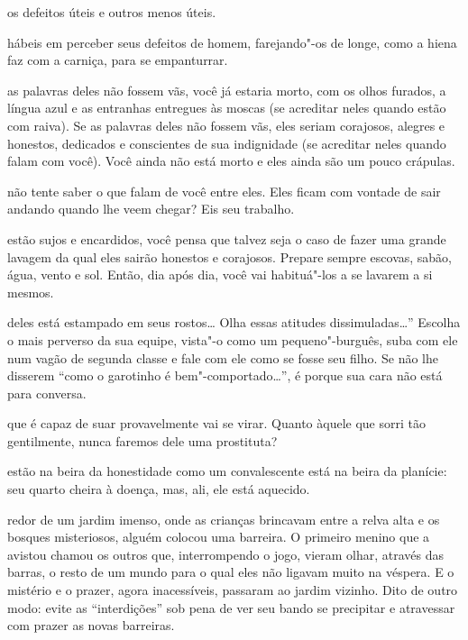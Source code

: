\pagebreak
\thispagestyle{empty}

\movetooddpage

 os defeitos úteis e outros menos úteis.



 hábeis em perceber seus defeitos de homem, farejando"-os de longe,
como a hiena faz com a carniça, para se empanturrar.



 as palavras deles não fossem vãs, você já estaria morto, com os olhos
furados, a língua azul e as entranhas entregues às moscas (se acreditar
neles quando estão com raiva). Se as palavras deles não fossem vãs, eles
seriam corajosos, alegres e honestos, dedicados e conscientes de sua
indignidade (se acreditar neles quando falam com você). Você ainda não
está morto e eles ainda são um pouco crápulas.



 não tente saber o que falam de você entre eles. Eles ficam
com vontade de sair andando quando lhe veem chegar? Eis seu trabalho.




\pagebreak

 estão sujos e encardidos, você pensa que talvez seja o caso de
fazer uma grande lavagem da qual eles sairão honestos e corajosos.
Prepare sempre escovas, sabão, água, vento e sol. Então, dia após dia,
você vai habituá"-los a se lavarem a si mesmos.

 deles está estampado em seus rostos\ldots{} Olha essas atitudes
dissimuladas\ldots{}'' Escolha o mais perverso da sua equipe, vista"-o como
um pequeno"-burguês, suba com ele num vagão de segunda classe e fale com
ele como se fosse seu filho. Se não lhe disserem ``como o garotinho é
bem"-comportado\ldots{}'', é porque sua cara não está para conversa.



 que é capaz de suar provavelmente vai se virar. Quanto àquele que
sorri tão gentilmente, nunca faremos dele uma prostituta?



 estão na beira da honestidade como um convalescente está na beira
da planície: seu quarto cheira à doença, mas, ali, ele está aquecido.



\pagebreak

 redor de um jardim imenso, onde as crianças brincavam entre a relva
alta e os bosques misteriosos, alguém colocou uma barreira. O primeiro
menino que a avistou chamou os outros que, interrompendo o jogo, vieram
olhar, através das barras, o resto de um mundo para o qual eles não
ligavam muito na véspera. E o mistério e o prazer, agora inacessíveis,
passaram ao jardim vizinho. Dito de outro modo: evite as ``interdições''
sob pena de ver seu bando se precipitar e atravessar com prazer as novas
barreiras. 


